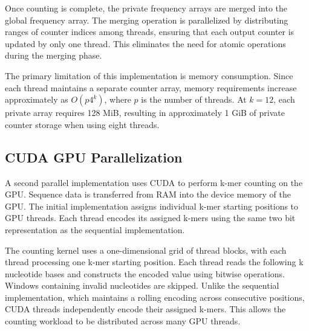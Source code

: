 \documentclass{article}
\begin{document}
\vspace{\baselineskip}

Once counting is complete, the private frequency arrays are merged into the global frequency array. The merging
operation is parallelized by distributing ranges of counter indices among threads, ensuring that each output
counter is updated by only one thread. This eliminates the need for atomic operations during the merging phase.

\vspace{\baselineskip}

The primary limitation of this implementation is memory consumption. Since each thread maintains a separate
counter array, memory requirements increase approximately as $O(p4^k)$, where $p$ is the number of threads.
At $k=12$, each private array requires 128 MiB, resulting in approximately 1 GiB of private counter storage
when using eight threads.

\vspace{\baselineskip}


\subsection{CUDA GPU Parallelization}

\vspace{\baselineskip}

A second parallel implementation uses CUDA to perform k-mer counting on the GPU. Sequence data is transferred from RAM into the device memory 
of the GPU. The initial implementation assigns individual k-mer starting positions to GPU threads. Each thread encodes its assigned k-mers using the 
same two bit representation as the sequential implementation. 

\vspace{\baselineskip}

The counting kernel uses a one-dimensional grid of thread blocks, with each thread processing one
k-mer starting position. Each thread reads the following k nucleotide bases and constructs the
encoded value using bitwise operations. Windows containing invalid nucleotides are skipped. Unlike
the sequential implementation, which maintains a rolling encoding across consecutive positions,
CUDA threads independently encode their assigned k-mers. This allows the counting workload to be
distributed across many GPU threads.

\vspace{\baselineskip}
\end{document}
